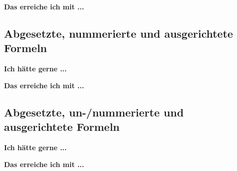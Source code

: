 \documentclass[twoside, 
               a4paper, 
               10pt, 
               parskip=full, 
               sectionentrydots=true, 
               listof=totoc, 
               listof=entryprefix,
               numbers=endperiod]{scrartcl}
\begin{document}
\newpage
{\textbf {Das erreiche ich mit ...}}
 
\begin{miniSeite}[colbacktitle=black!35!white,title=\LaTeX-Code]

\end{miniSeite}




\newpage
\subsection{Abgesetzte, nummerierte und ausgerichtete Formeln}
{\textbf {Ich hätte gerne ...}}
 
\begin{miniSeite}[colbacktitle=black!35!white,title=Ausdruck]

\end{miniSeite}


\newpage
{\textbf {Das erreiche ich mit ...}}
 
\begin{miniSeite}[colbacktitle=black!35!white,title=\LaTeX-Code]

\end{miniSeite}




\newpage
\subsection{Abgesetzte, un-/nummerierte und ausgerichtete Formeln}
{\textbf {Ich hätte gerne ...}}
 
\begin{miniSeite}[colbacktitle=black!35!white,title=Ausdruck]

\end{miniSeite}


\newpage
{\textbf {Das erreiche ich mit ...}}
 
\begin{miniSeite}[colbacktitle=black!35!white,title=\LaTeX-Code]

\end{miniSeite}

\end{document}
